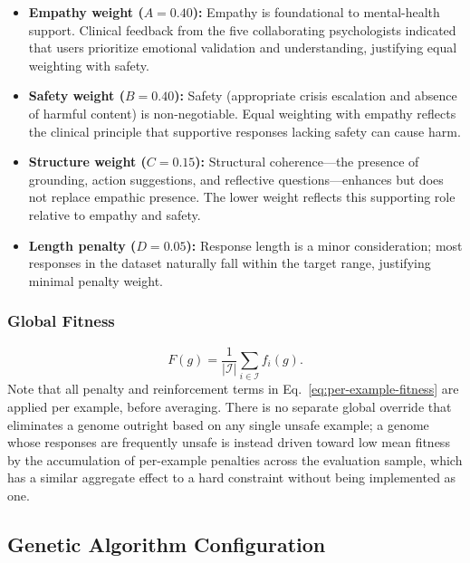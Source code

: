 \documentclass[mathematics,article,xetex,moreauthors]{Definitions/mdpi}
\begin{document}
\begin{itemize}
    \item \textbf{Empathy weight ($A = 0.40$):} Empathy is foundational to mental-health support. 
    Clinical feedback from the five collaborating psychologists indicated that users prioritize 
    emotional validation and understanding, justifying equal weighting with safety.
    
    \item \textbf{Safety weight ($B = 0.40$):} Safety (appropriate crisis escalation and absence of 
    harmful content) is non-negotiable. Equal weighting with empathy reflects the clinical principle 
    that supportive responses lacking safety can cause harm.
    
    \item \textbf{Structure weight ($C = 0.15$):} Structural coherence---the presence of grounding, 
    action suggestions, and reflective questions---enhances but does not replace empathic presence. 
    The lower weight reflects this supporting role relative to empathy and safety.
    
    \item \textbf{Length penalty ($D = 0.05$):} Response length is a minor consideration; most 
    responses in the dataset naturally fall within the target range, justifying minimal penalty weight.
\end{itemize}

\subsubsection{Global Fitness}
\begin{equation}
\label{eq:global}
  F(g) = \frac{1}{|\mathcal{I}|} \sum_{i \in \mathcal{I}} f_i(g).
\end{equation}
Note that all penalty and reinforcement terms in Eq.~\eqref{eq:per-example-fitness}
are applied per example, before averaging. There is no separate global
override that eliminates a genome outright based on any single unsafe
example; a genome whose responses are frequently unsafe is instead driven
toward low mean fitness by the accumulation of per-example penalties across
the evaluation sample, which has a similar aggregate effect to a hard
constraint without being implemented as one.

\subsection{Genetic Algorithm Configuration}
\label{sec:ga-config}
\end{document}
